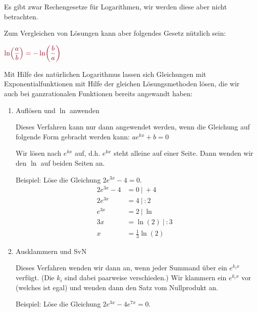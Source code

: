 \newpage
Es gibt zwar Rechengesetze für Logarithmen, wir werden diese aber nicht betrachten.

Zum Vergleichen von Lösungen kann aber folgendes Gesetz nützlich sein:
\begin{tcolorbox}\centering
	\(\textcolor{loestc}{\ln\left(\dfrac{a}{b}\right)=-\ln\left(\dfrac{b}{a}\right)}\)
\end{tcolorbox}
Mit Hilfe des natürlichen Logarithmus lassen sich Gleichungen mit Exponentialfunktionen mit Hilfe der gleichen Lösungsmethoden lösen, die wir auch bei ganzrationalen Funktionen bereits angewandt haben:
\begin{enumerate}[label=\arabic*)]
	\item Auflösen und \(\ln\) anwenden

	Dieses Verfahren kann nur dann angewendet werden, wenn die Gleichung auf folgende Form gebracht werden kann: \(ae^{kx}+b=0\)

	Wir lösen nach \(e^{kx}\) auf, d.h. \(e^{kx}\) steht alleine auf einer Seite. Dann wenden wir den \(\ln\) auf beiden Seiten an.

	Beispiel: Löse die Gleichung \(2e^{3x}-4=0\).
	\textcolor{loes}{\begin{align*}
			2e^{3x}-4&=0\ \vert\ +4\\
			2e^{3x}&=4\ \vert\ :2\\
			e^{3x}&=2\ \vert\ \ln\\
			3x&=\ln\left(2\right)\ \vert\ :3\\
			x&=\frac{1}{3}\ln\left(2\right)
	\end{align*}}
	\item Ausklammern und SvN

	Dieses Verfahren wenden wir dann an, wenn jeder Summand über ein \(e^{k_ix}\) verfügt. (Die \(k_i\) sind dabei paarweise verschieden.) Wir klammern ein \(e^{k_ix}\) vor (welches ist egal) und wenden dann den Satz vom Nullprodukt an.

	Beispiel: Löse die Gleichung \(2e^{3x}-4e^{7x}=0\).
\end{enumerate}

\medskip

